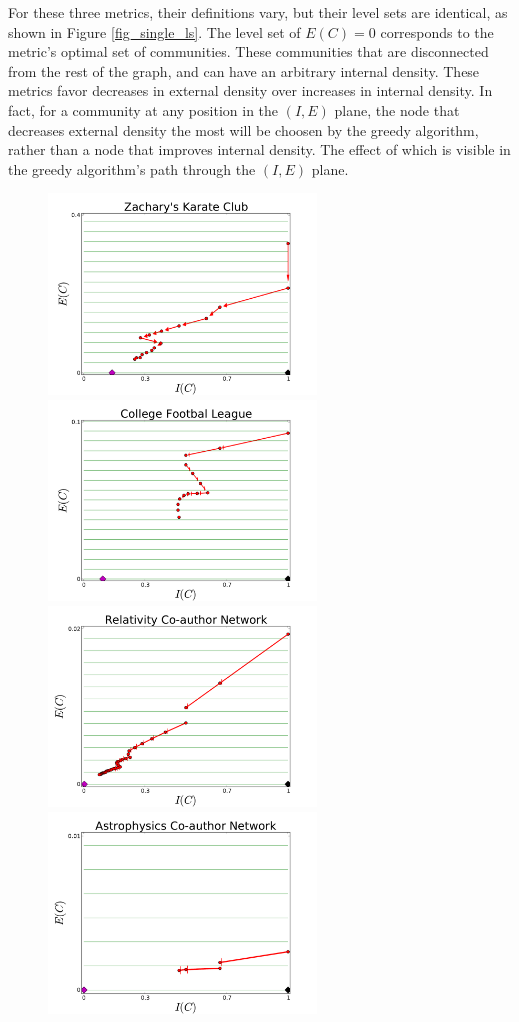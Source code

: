 \documentclass[phd,tocprelim]{cornell}
\begin{document}
For these three metrics, their definitions vary, but their level sets are identical, as shown in Figure \ref{fig_single_ls}.   The level set of $E(C) = 0$ corresponds to the metric's optimal set of communities.  These communities that are disconnected from the rest of the graph, and can have an arbitrary internal density.  These metrics favor decreases in external density over increases in internal density.  In fact, for a community at any position in the $(I, E)$ plane, the node that decreases external density the most will be choosen by the greedy algorithm, rather than a node that improves internal density.  The effect of which is visible in the greedy algorithm's path through the $(I, E)$ plane.

\begin{figure}[!h]
\centering
\includegraphics[width=2.8in]{Figures/cee_karate}
\includegraphics[width=2.8in]{Figures/cee_cfl}
\includegraphics[width=2.8in]{Figures/cee_relativity}
\includegraphics[width=2.8in]{Figures/cee_astro}

\end{figure}
\end{document}
